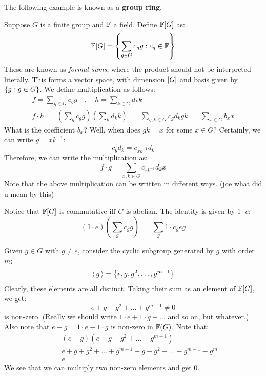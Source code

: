 The following example is known as a \textbf{group ring}.

Suppose $ G $ is a finite group and $ \mathbb{F} $ a field.
Define $ \mathbb{F}[G] $ as:
\begin{equation*}
    \mathbb{F}[G] = \left\{{\sum_{g \in G} c_{g}g : c_{g} \in \mathbb{F}}\right\}
\end{equation*}
These are known as \textit{formal sums}, where the product should not be interpreted literally.
This forms a vector space, with dimension $ \abs{G} $ and basis given by $ \left\{{g : g \in G}\right\} $.
We define multiplication as follows:
\begin{gather*}
    f = \sum_{g \in G}c_{g}g \quad , \quad h = \sum_{k \in G}d_{k}k \\
    f\cdot h \ = \ \left( \sum_{g}c_{g}g \right)\left( \sum_{k}d_{k}k \right)
    \ = \ \sum_{g,k \in G}c_{g}d_{k}gk \ = \ \sum_{x \in G} b_{x}x
\end{gather*}
What is the coefficient $ b_{x} $? Well, when does $ gk = x $ for some $ x \in G $?
Certainly, we can write $ g = xk^{-1} $:
\begin{equation*}
    c_{g}d_{k} = c_{xk^{-1}}d_{k}
\end{equation*}
Therefore, we can write the multiplication as:
\begin{equation*}
    f\cdot g = \sum_{x, k \in G}c_{xk^{-1}}d_{k}x
\end{equation*}
Note that the above multiplication can be written in different ways.
(joe what did u mean by this)

Notice that $ \mathbb{F}[G] $ is commutative iff $ G $ is abelian.
The identity is given by $ 1 \cdot e $:
\begin{equation*}
    (1 \cdot e)\left( \sum_{g}c_{g}g \right) \ = \ \sum_{g}1\cdot c_{g}eg
\end{equation*}

Given $ g \in G $ with $ g \neq e $, consider the cyclic subgroup generated by $ g $ with
order $ m $:
\begin{equation*}
    \operatorname{\langle} g \operatorname{\rangle} = \left\{{e, g, g^{2}, \dots, g^{m-1}}\right\}
\end{equation*}
Clearly, these elements are all distinct.
Taking their sum as an element of $ \mathbb{F}[G] $, we get:
\begin{equation*}
    e + g + g^{2} + \dots + g^{m-1} \neq 0
\end{equation*}
is non-zero.
(Really we should write $ 1\cdot e + 1\cdot g + \dots $ and so on, but whatever.)
Also note that $ e-g = 1\cdot e - 1\cdot g $ is non-zero in $ \mathbb{F}(G) $. Note that:
\begin{align*}
    & (e-g)(e + g + g^{2} + \dots + g^{m-1}) \\
    = \ & e+g+g^{2}+\dots+g^{m-1} - g-g^{2}-\dots-g^{m-1}-g^{m} \\
    = \ & e
\end{align*}
We see that we can multiply two non-zero elements and get $ 0 $.

